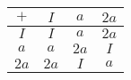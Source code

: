 \begin{tabular}{c|ccc}
$+$&$I$&$a$&$2a$\\
\hline
$I$&$I$&$a$&$2a$\\
$a$&$a$&$2a$&$I$\\
$2a$&$2a$&$I$&$a$\\
\end{tabular}
